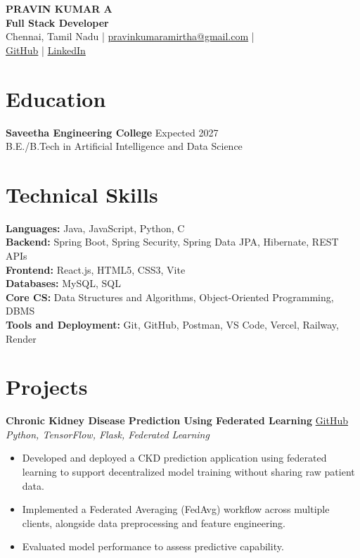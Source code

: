 \documentclass[10pt,a4paper]{article}
\begin{document}
\small

\begin{center}
    {\LARGE \textbf{PRAVIN KUMAR A}}\\[3pt]
    \textbf{Full Stack Developer}\\[3pt]
    Chennai, Tamil Nadu \;|\;
    \href{mailto:pravinkumaramirtha@gmail.com}{pravinkumaramirtha@gmail.com}
    \;|\\[2pt]
    \href{https://github.com/pravinkumarAmirthalingam}{GitHub}
    \;|\;
    \href{https://www.linkedin.com/in/pravinnamirtha}{LinkedIn}
\end{center}

\section{Education}
\textbf{Saveetha Engineering College} \hfill Expected 2027\\
B.E./B.Tech in Artificial Intelligence and Data Science

\section{Technical Skills}
\textbf{Languages:} Java, JavaScript, Python, C\\
\textbf{Backend:} Spring Boot, Spring Security, Spring Data JPA, Hibernate, REST APIs\\
\textbf{Frontend:} React.js, HTML5, CSS3, Vite\\
\textbf{Databases:} MySQL, SQL\\
\textbf{Core CS:} Data Structures and Algorithms, Object-Oriented Programming, DBMS\\
\textbf{Tools and Deployment:} Git, GitHub, Postman, VS Code, Vercel, Railway, Render

\section{Projects}

\textbf{Chronic Kidney Disease Prediction Using Federated Learning}
\hfill
\href{https://github.com/pravinkumarAmirthalingam/Federated-Learning-Based-Prediction-of-Chronic-Kidney-Diseases}{GitHub}\\
\textit{Python, TensorFlow, Flask, Federated Learning}
\begin{itemize}
    \item Developed and deployed a CKD prediction application using federated learning to support decentralized model training without sharing raw patient data.
    \item Implemented a Federated Averaging (FedAvg) workflow across multiple clients, alongside data preprocessing and feature engineering.
    \item Evaluated model performance to assess predictive capability.
\end{itemize}
\end{document}
